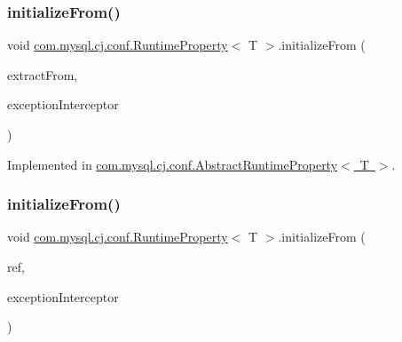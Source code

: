 \mbox{\label{interfacecom_1_1mysql_1_1cj_1_1conf_1_1_runtime_property_a0ab00125bf110114bb1608e51167b4fd}} 
\subsubsection{\texorpdfstring{initialize\+From()}{initializeFrom()}\hspace{0.1cm}{\footnotesize\ttfamily [1/2]}}
{\footnotesize\ttfamily void \mbox{\hyperlink{interfacecom_1_1mysql_1_1cj_1_1conf_1_1_runtime_property}{com.\+mysql.\+cj.\+conf.\+Runtime\+Property}}$<$ T $>$.initialize\+From (\begin{DoxyParamCaption}\item[{Properties}]{extract\+From,  }\item[{\mbox{\hyperlink{interfacecom_1_1mysql_1_1cj_1_1exceptions_1_1_exception_interceptor}{Exception\+Interceptor}}}]{exception\+Interceptor }\end{DoxyParamCaption})}



Implemented in \mbox{\hyperlink{classcom_1_1mysql_1_1cj_1_1conf_1_1_abstract_runtime_property_aa821d8b742dfb3c658972f11f57ad02c}{com.\+mysql.\+cj.\+conf.\+Abstract\+Runtime\+Property$<$ T $>$}}.

\mbox{\label{interfacecom_1_1mysql_1_1cj_1_1conf_1_1_runtime_property_a082d6bf96ac4865da37f76b4315a2262}} 
\subsubsection{\texorpdfstring{initialize\+From()}{initializeFrom()}\hspace{0.1cm}{\footnotesize\ttfamily [2/2]}}
{\footnotesize\ttfamily void \mbox{\hyperlink{interfacecom_1_1mysql_1_1cj_1_1conf_1_1_runtime_property}{com.\+mysql.\+cj.\+conf.\+Runtime\+Property}}$<$ T $>$.initialize\+From (\begin{DoxyParamCaption}\item[{Reference}]{ref,  }\item[{\mbox{\hyperlink{interfacecom_1_1mysql_1_1cj_1_1exceptions_1_1_exception_interceptor}{Exception\+Interceptor}}}]{exception\+Interceptor }\end{DoxyParamCaption})}



